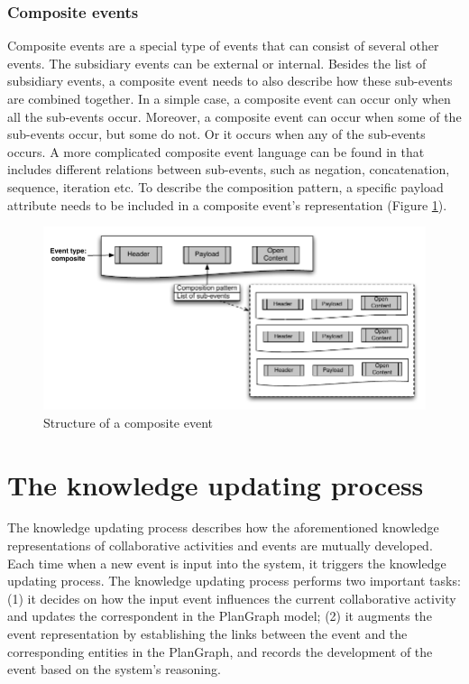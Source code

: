 \subsubsection{Composite events} %
\label{ssub:composite_events}
Composite events are a special type of events that can consist of several other events. The subsidiary events can be external or internal. Besides the list of subsidiary events, a composite event needs to also describe how these sub-events are combined together. In a simple case, a composite event can occur only when all the sub-events occur. Moreover, a composite event can occur when some of the sub-events occur, but some do not. Or it occurs when any of the sub-events occurs. A more complicated composite event language can be found in \cite{Mhl2010} that includes different relations between sub-events, such as negation, concatenation, sequence, iteration etc. To describe the composition pattern, a specific payload attribute needs to be included in a composite event's representation (Figure \ref{fig:composite_event}).
\begin{figure}[htbp] %
	\centering
	\includegraphics{composite_event.pdf} 
	\caption{Structure of a composite event}
	\label{fig:composite_event}
\end{figure}

\section{The knowledge updating process} %
\label{sec:knowledge_updating_process}
The knowledge updating process describes how the aforementioned knowledge representations of collaborative activities and events are mutually developed. Each time when a new event is input into the system, it triggers the knowledge updating process. The knowledge updating process performs two important tasks: (1) it decides on how the input event influences the current collaborative activity and updates the correspondent in the PlanGraph model; (2) it augments the event representation by establishing the links between the event and the corresponding entities in the PlanGraph, and records the development of the event based on the system's reasoning.

